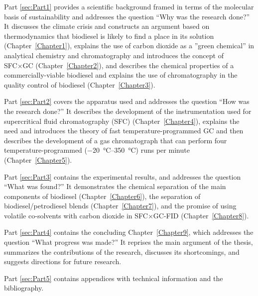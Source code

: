 \begin{description}
 
\item{Part \ref{sec:Part1}}{ provides a scientific background framed in terms of
the molecular basis of sustainability and addresses the question ``Why was the
research done?'' It discusses the climate crisis and constructs an argument 
based on thermodynamics that biodiesel is likely to find a place in its solution
(Chapter~\ref{Chapter1}), explains the use of carbon dioxide as a ''green
chemical'' in analytical chemistry and chromatography and introduces the concept
of SFC×GC (Chapter~\ref{Chapter2}), and describes the chemical properties of a
commercially-viable biodiesel and explains the use of chromatography in the
quality control of biodiesel (Chapter~\ref{Chapter3}).}

\item{Part \ref{sec:Part2}}{ covers the apparatus used and addresses the
question ``How was the research done?'' It describes the development of the
instrumentation used for supercritical fluid chromatography (SFC)
(Chapter~\ref{Chapter4}), explains the need and introduces the theory of fast
temperature-programmed GC and then describes the development of a gas
chromatograph that can perform four temperature\hyp{}programmed
(\SIrange{-20}{350}{\celsius}) runs per minute (Chapter~\ref{Chapter5}).}

\item{Part \ref{sec:Part3}}{ contains the experimental results, and addresses
the question ``What was found?'' It demonstrates the chemical separation of the
main components of biodiesel (Chapter~\ref{Chapter6}), the separation of
biodiesel/petrodiesel blends (Chapter~\ref{Chapter7}), and the promise of using
volatile co-solvents with carbon dioxide in SFC×GC-FID (Chapter~\ref{Chapter8}).}

\item{Part \ref{sec:Part4}}{ contains the concluding Chapter~\ref{Chapter9},
which addresses the question ``What progress was made?'' It reprises the main
argument of the thesis, summarizes the contributions of the research, discusses
its shortcomings, and suggests directions for future research.}

\item{Part \ref{sec:Part5}}{ contains appendices with technical information and the bibliography.} 

\end{description}

